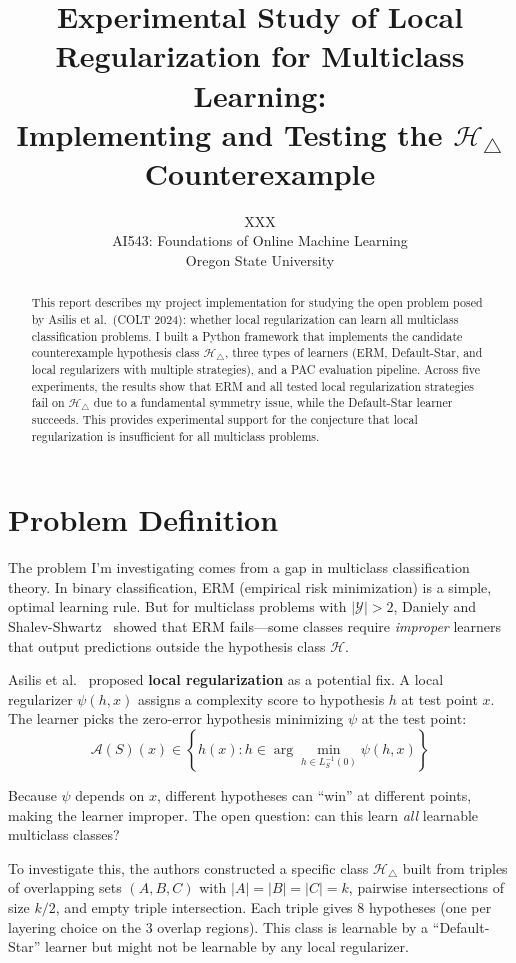 \documentclass[final]{article}
\title{Experimental Study of Local Regularization for Multiclass Learning:\\Implementing and Testing the $\mathcal{H}_\triangle$ Counterexample}
\author{
  XXX \\%
  AI543: Foundations of Online Machine Learning\\
  Oregon State University\\
}
\date{}
\begin{document}
\maketitle

\begin{abstract}
This report describes my project implementation for studying the open problem posed by Asilis et al.\ (COLT 2024): whether local regularization can learn all multiclass classification problems. I built a Python framework that implements the candidate counterexample hypothesis class $\mathcal{H}_\triangle$, three types of learners (ERM, Default-Star, and local regularizers with multiple strategies), and a PAC evaluation pipeline. Across five experiments, the results show that ERM and all tested local regularization strategies fail on $\mathcal{H}_\triangle$ due to a fundamental symmetry issue, while the Default-Star learner succeeds. This provides experimental support for the conjecture that local regularization is insufficient for all multiclass problems.
\end{abstract}

\section{Problem Definition}

The problem I'm investigating comes from a gap in multiclass classification theory. In binary classification, ERM (empirical risk minimization) is a simple, optimal learning rule. But for multiclass problems with $|\mathcal{Y}| > 2$, Daniely and Shalev-Shwartz~\citep{daniely2014} showed that ERM fails---some classes require \textit{improper} learners that output predictions outside the hypothesis class $\mathcal{H}$.

Asilis et al.~\citep{asilis2024open} proposed \textbf{local regularization} as a potential fix. A local regularizer $\psi(h, x)$ assigns a complexity score to hypothesis $h$ at test point $x$. The learner picks the zero-error hypothesis minimizing $\psi$ at the test point:
$$\mathcal{A}(S)(x) \in \left\{ h(x) : h \in \arg\min_{h \in L_S^{-1}(0)} \psi(h, x) \right\}$$

Because $\psi$ depends on $x$, different hypotheses can ``win'' at different points, making the learner improper. The open question: can this learn \textit{all} learnable multiclass classes?

To investigate this, the authors constructed a specific class $\mathcal{H}_\triangle$ built from triples of overlapping sets $(A, B, C)$ with $|A|=|B|=|C|=k$, pairwise intersections of size $k/2$, and empty triple intersection. Each triple gives 8 hypotheses (one per layering choice on the 3 overlap regions). This class is learnable by a ``Default-Star'' learner but might not be learnable by any local regularizer.
\end{document}
